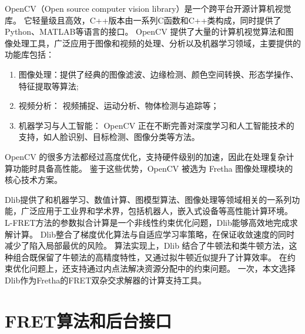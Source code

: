 OpenCV（Open source computer vision library）是一个跨平台开源计算机视觉库。
它轻量级且高效，C++版本由一系列C函数和C++类构成，同时提供了Python、MATLAB等语言的接口。
OpenCV 提供了大量的计算机视觉算法和图像处理工具，广泛应用于图像和视频的处理、分析以及机器学习领域，主要提供的功能库包括：
\begin{enumerate}
  \item 图像处理：提供了经典的图像滤波、边缘检测、颜色空间转换、形态学操作、特征提取等算法;
  \item 视频分析： 视频捕捉、运动分析、物体检测与追踪等；
  \item 机器学习与人工智能： OpenCV 正在不断完善对深度学习和人工智能技术的支持，如人脸识别、目标检测、图像分类等方法。
\end{enumerate}
OpenCV 的很多方法都经过高度优化，支持硬件级别的加速，因此在处理复杂计算功能时具备高性能。
鉴于这些优势，OpenCV 被选为 Fretha 图像处理模块的核心技术方案。

Dlib提供了和机器学习、数值计算、图模型算法、图像处理等领域相关的一系列功能，广泛应用于工业界和学术界，包括机器人，嵌入式设备等高性能计算环境。
L-FRET方法的参数拟合计算是一个非线性约束优化问题，Dlib能够高效地完成求解计算。
Dlib整合了梯度优化算法与自适应学习率策略，在保证收敛速度的同时减少了陷入局部最优的风险。
算法实现上，Dlib 结合了牛顿法和类牛顿方法，这种组合既保留了牛顿法的高精度特性，又通过拟牛顿近似提升了计算效率。
在约束优化问题上，还支持通过内点法解决资源分配中的约束问题。
一次，本文选择Dlib作为Fretha的FRET双杂交求解器的计算支持工具。
\fi

\section{FRET算法和后台接口}


